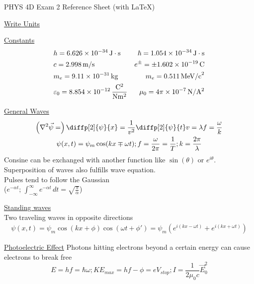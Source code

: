 \documentclass[8pt]{extarticle}
\newcommand{\E}[1]{\times 10^{#1}}
\begin{document}
    \setlength{\parindent}{0pt}
    \setlength{\columnsep}{0.5cm}
    \twocolumn
    PHYS 4D Exam 2 Reference Sheet (with \LaTeX)

    \underline{Write Units}

    \underline{Constants}
        \begin{align*}
            &h = 6.626\E{-34}\,\unit{\joule\cdot\second}    &\hbar = 1.054\E{-34}\,\unit{\joule\cdot\second}\\
            &c = 2.998\,\unit{\meter/\second}   &e^{\pm} = \pm 1.602\E{-19}\,\unit{\coulomb}\\
            &m_e = 9.11\E{-31}\,\unit{\kilo\gram} &m_e = 0.511\,\text{MeV/c}^2\\
            &\varepsilon_0 = 8.854\E{-12}\,\unit{\frac{\coulomb^2}{\newton\meter^2}} &\mu_0 = 4\pi\E{-7}\,\unit{\newton/\ampere^2}
        \end{align*}
    
    \underline{General Waves}
    \begin{gather*}
        \left( \nabla^2 \vec{\psi} = \right) \diffp[2]{\psi}{x} = \frac{1}{v^2}\diffp[2]{\psi}{t}
        v = \lambda f = \frac{\omega}{k}\\
        \psi(x,t) = \psi_m \cos(kx \mp \omega t);
        f = \frac{\omega}{2\pi} = \frac{1}{T}; k = \frac{2\pi}{\lambda}
    \end{gather*}
    Consine can be exchanged with another function like $\sin(\theta)$ or $e^{i\theta}$.\\
    Superposition of waves also fulfills wave equation.\\
    Pulses tend to follow the Gaussian \\
    ($e^{-\alpha t}$; $\int_{-\infty}^{\infty} e^{-\alpha t}\,dt = \sqrt{\frac{\pi}{\alpha}}$)

    \underline{Standing waves}\\
    Two traveling waves in opposite directions
    \begin{gather*}
        \psi(x,t)   =   \psi_m \cos(kx + \phi)\cos(\omega t + \phi')
        =   \psi_m \left( e^{i(kx - \omega t)} + e^{i(kx + \omega t)} \right)
    \end{gather*}

    \underline{Photoelectric Effect}
        Photons hitting electrons beyond a certain energy can cause electrons to break free
        \begin{equation*}
            {\scriptstyle E = hf = \hbar\omega; KE_{max} = hf - \phi = eV_{stop}; I = \frac{1}{2\mu_0 c} \vec{E}_0^2}
        \end{equation*}
\end{document}
